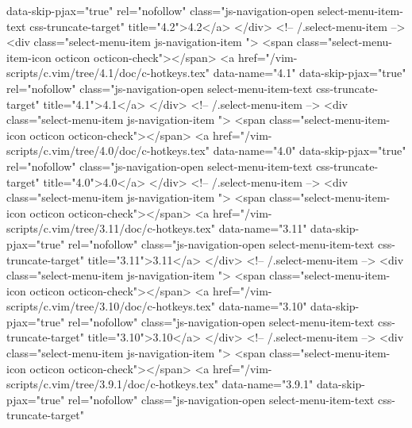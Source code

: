                  data-skip-pjax="true"
                 rel="nofollow"
                 class="js-navigation-open select-menu-item-text css-truncate-target"
                 title="4.2">4.2</a>
            </div> <!-- /.select-menu-item -->
            <div class="select-menu-item js-navigation-item ">
              <span class="select-menu-item-icon octicon octicon-check"></span>
              <a href="/vim-scripts/c.vim/tree/4.1/doc/c-hotkeys.tex"
                 data-name="4.1"
                 data-skip-pjax="true"
                 rel="nofollow"
                 class="js-navigation-open select-menu-item-text css-truncate-target"
                 title="4.1">4.1</a>
            </div> <!-- /.select-menu-item -->
            <div class="select-menu-item js-navigation-item ">
              <span class="select-menu-item-icon octicon octicon-check"></span>
              <a href="/vim-scripts/c.vim/tree/4.0/doc/c-hotkeys.tex"
                 data-name="4.0"
                 data-skip-pjax="true"
                 rel="nofollow"
                 class="js-navigation-open select-menu-item-text css-truncate-target"
                 title="4.0">4.0</a>
            </div> <!-- /.select-menu-item -->
            <div class="select-menu-item js-navigation-item ">
              <span class="select-menu-item-icon octicon octicon-check"></span>
              <a href="/vim-scripts/c.vim/tree/3.11/doc/c-hotkeys.tex"
                 data-name="3.11"
                 data-skip-pjax="true"
                 rel="nofollow"
                 class="js-navigation-open select-menu-item-text css-truncate-target"
                 title="3.11">3.11</a>
            </div> <!-- /.select-menu-item -->
            <div class="select-menu-item js-navigation-item ">
              <span class="select-menu-item-icon octicon octicon-check"></span>
              <a href="/vim-scripts/c.vim/tree/3.10/doc/c-hotkeys.tex"
                 data-name="3.10"
                 data-skip-pjax="true"
                 rel="nofollow"
                 class="js-navigation-open select-menu-item-text css-truncate-target"
                 title="3.10">3.10</a>
            </div> <!-- /.select-menu-item -->
            <div class="select-menu-item js-navigation-item ">
              <span class="select-menu-item-icon octicon octicon-check"></span>
              <a href="/vim-scripts/c.vim/tree/3.9.1/doc/c-hotkeys.tex"
                 data-name="3.9.1"
                 data-skip-pjax="true"
                 rel="nofollow"
                 class="js-navigation-open select-menu-item-text css-truncate-target"
